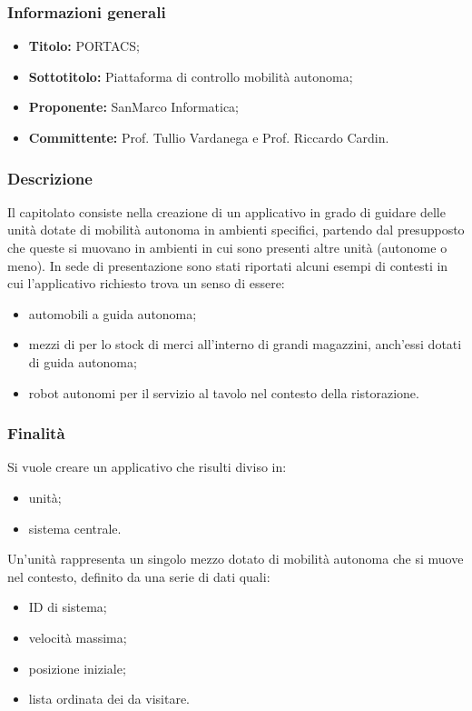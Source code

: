 \documentclass[]{article}
\begin{document}
			\subsubsection{Informazioni generali}
				\begin{itemize}
					\item \textbf{Titolo:} PORTACS;
					\item \textbf{Sottotitolo:} Piattaforma di controllo mobilità autonoma;
					\item \textbf{Proponente:} SanMarco Informatica;
					\item \textbf{Committente:} Prof. Tullio Vardanega e Prof. Riccardo Cardin.
				\end{itemize}

			\subsubsection{Descrizione}
			Il capitolato consiste nella creazione di un applicativo  in grado di guidare delle unità dotate di mobilità autonoma in ambienti specifici, partendo dal presupposto che queste si muovano in ambienti in cui sono presenti altre unità (autonome o meno). In sede di presentazione sono stati riportati alcuni esempi di contesti in cui l'applicativo richiesto trova un senso di essere:
			\begin{itemize}
				\item automobili a guida autonoma;
				\item mezzi di per lo stock di merci all'interno di grandi magazzini, anch'essi dotati di guida autonoma;
				\item robot autonomi per il servizio al tavolo nel contesto della ristorazione.
			\end{itemize}

			\subsubsection{Finalità}
			Si vuole creare un applicativo che risulti diviso in:
			\begin{itemize}
				\item unità;
				\item sistema centrale.
			\end{itemize}
			Un'unità rappresenta un singolo mezzo dotato di mobilità autonoma che si muove nel contesto, definito da una serie di dati quali:
			 \begin{itemize}
			 	\item ID di sistema;
			 	\item velocità massima;
			 	\item posizione iniziale;
			 	\item lista ordinata dei  da visitare.
			 \end{itemize}
\end{document}
